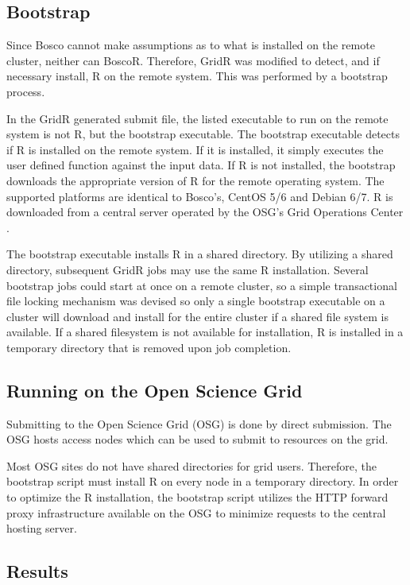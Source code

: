 \subsection{Bootstrap}
\label{sec:bootstrap}

Since Bosco cannot make assumptions as to what is installed on the remote cluster, neither can BoscoR.  Therefore, GridR was modified to detect, and if necessary install, R on the remote system.  This was performed by a bootstrap process.

In the GridR generated submit file, the listed executable to run on the remote system is not R, but the bootstrap executable.  The bootstrap executable detects if R is installed on the remote system.  If it is installed, it simply executes the user defined function against the input data.  If R is not installed, the bootstrap downloads the appropriate version of R for the remote operating system.  The supported platforms are identical to Bosco's, CentOS 5/6 and Debian 6/7.  R is downloaded from a central server operated by the OSG's Grid Operations Center \cite{osgoperations}.  

The bootstrap executable installs R in a shared directory.  By utilizing a shared directory, subsequent GridR jobs may use the same R installation.  Several bootstrap jobs could start at once on a remote cluster, so a simple transactional file locking mechanism was devised so only a single bootstrap executable on a cluster will download and install for the entire cluster if a shared file system is available.  If a shared filesystem is not available for installation, R is installed in a temporary directory that is removed upon job completion.

\subsection{Running on the Open Science Grid}

Submitting to the Open Science Grid (OSG) is done by direct submission.  The OSG hosts access nodes which can be used to submit to resources on the grid.

Most OSG sites do not have shared directories for grid users.  Therefore, the bootstrap script must install R on every node in a temporary directory.  In order to optimize the R installation, the bootstrap script utilizes the HTTP forward proxy infrastructure \cite{garzoglio2012supporting} available on the OSG to minimize requests to the central hosting server.


\subsection{Results}
\label{sec:results}


